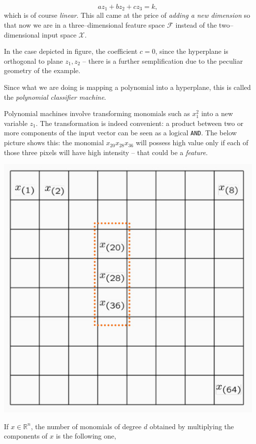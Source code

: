 \documentclass[10pt]{report}
\begin{document}
$$az_1 + bz_2 + cz_3 = k,$$ which is of course \emph{linear}. This all came at the
price of \emph{adding a new dimension} so that now we are in a three--dimensional
feature space \(\mathcal F\) instead of the two--dimensional input space \(\mathcal
X\).

In the case depicted in figure, the coefficient \(c = 0\), since the hyperplane is
orthogonal to plane \(z_1, z_2\) -- there is a further semplification due to the
peculiar geometry of the example.

Since what we are doing is mapping a polynomial into a hyperplane, this is
called the \emph{polynomial classifier machine}.

Polynomial machines involve transforming monomials such as \(x_1^2\) into a new
variable \(z_1\). The transformation is indeed convenient: a product between two
or more components of the input vector can be seen as a logical \texttt{AND}. The below
picture shows this: the monomial \(x_{20} x_{28} x_{36}\) will possess high value only
if each of those three pixels will have high intensity -- that could be a
\emph{feature}.

\begin{center}
\includegraphics[width=.9\linewidth]{./pics/svm/polynomial-monomials.jpg}
\end{center}

If \(x \in \mathbb{R}^n\), the number of monomials of degree \(d\) obtained by multiplying the components of \(x\) is the following one,
\end{document}
